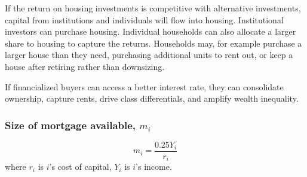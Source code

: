 If the return on housing investments is competitive with alternative investments, capital from institutions and individuals will flow into housing. Institutional investors can purchase housing.  Individual households can also allocate a larger share to housing to capture the returns.
Households may, for example purchase a larger house than they need, purchasing additional units to rent out, or keep a house after retiring rather than downsizing.  %

If financialized buyers can access a better interest rate, they can consolidate ownership, capture rents, drive class differentials, and amplify wealth inequality. %




\subsubsection{Size of mortgage available, $m_i$}
\[m_i= \frac{0.25Y_i}{r_i}\]
where $r_i$ is $i$'s cost of capital, $Y_i$ is $i$'s income.

